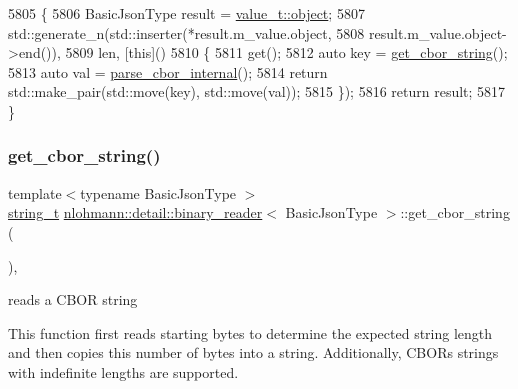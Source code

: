 \begin{DoxyCode}
5805     \{
5806         BasicJsonType result = \hyperlink{namespacenlohmann_1_1detail_a1ed8fc6239da25abcaf681d30ace4985aa8cfde6331bd59eb2ac96f8911c4b666}{value\_t::object};
5807         std::generate\_n(std::inserter(*result.m\_value.object,
5808                                       result.m\_value.object->end()),
5809                         len, [\textcolor{keyword}{this}]()
5810         \{
5811             \textcolor{keyword}{get}();
5812             \textcolor{keyword}{auto} key = \hyperlink{classnlohmann_1_1detail_1_1binary__reader_ac626ec37d1724d9d36d918c6361f8e57}{get\_cbor\_string}();
5813             \textcolor{keyword}{auto} val = \hyperlink{classnlohmann_1_1detail_1_1binary__reader_a0d919ee892fbbeedb27ff95c4e4010e1}{parse\_cbor\_internal}();
5814             \textcolor{keywordflow}{return} std::make\_pair(std::move(key), std::move(val));
5815         \});
5816         \textcolor{keywordflow}{return} result;
5817     \}
\end{DoxyCode}
\mbox{\label{classnlohmann_1_1detail_1_1binary__reader_ac626ec37d1724d9d36d918c6361f8e57}} 
\subsubsection{\texorpdfstring{get\+\_\+cbor\+\_\+string()}{get\_cbor\_string()}}
{\footnotesize\ttfamily template$<$typename Basic\+Json\+Type $>$ \\
\hyperlink{classnlohmann_1_1detail_1_1binary__reader_a889a8702ca8aa45e99136bc31ea898e9}{string\+\_\+t} \hyperlink{classnlohmann_1_1detail_1_1binary__reader}{nlohmann\+::detail\+::binary\+\_\+reader}$<$ Basic\+Json\+Type $>$\+::get\+\_\+cbor\+\_\+string (\begin{DoxyParamCaption}{ }\end{DoxyParamCaption})\hspace{0.3cm}{\ttfamily [inline]}, {\ttfamily [private]}}



reads a C\+B\+OR string 

This function first reads starting bytes to determine the expected string length and then copies this number of bytes into a string. Additionally, C\+B\+OR\textquotesingle{}s strings with indefinite lengths are supported.

